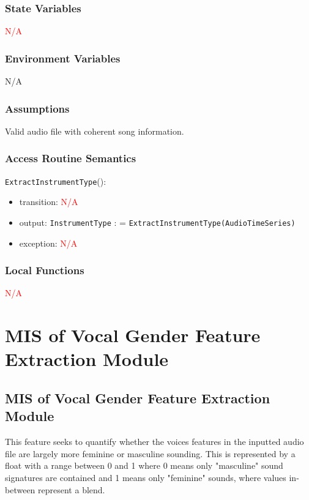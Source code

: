 \documentclass[12pt, titlepage]{article}
\begin{document}
\subsubsection{State Variables}
\textcolor{red}{N/A}

\subsubsection{Environment Variables}
N/A

\subsubsection{Assumptions}
Valid audio file with coherent song information.

\subsubsection{Access Routine Semantics}

\noindent \texttt{Extract\textunderscore Instrument\textunderscore Type}():
\begin{itemize}
\item transition: \textcolor{red}{N/A} 
\item output: \texttt{InstrumentType} : = \texttt{Extract\textunderscore Instrument\textunderscore Type(Audio\textunderscore Time\textunderscore Series)}
\item exception: \textcolor{red}{N/A} 
\end{itemize}

\subsubsection{Local Functions}
\textcolor{red}{N/A}


\section{MIS of Vocal Gender Feature Extraction Module} 

\subsection{MIS of Vocal Gender Feature Extraction Module}
This feature seeks to quantify whether the voices features in the inputted audio file 
are largely more feminine or masculine sounding. This is represented by a float with a range between
0 and 1 where 0 means only "masculine" sound signatures are contained and 1 means only "feminine" sounds,
where values in-between represent a blend. 
\end{document}
